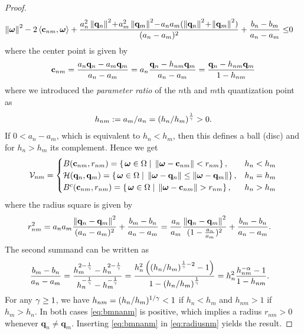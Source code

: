 \documentclass[12pt,onecolumn,final,letterpaper]{IEEEtran}
\renewcommand{\vp}{\mathbf q}
\newcommand{\HS}{\ensuremath{\mathcal{H}}}          %
\newcommand{\Vor}{\ensuremath{\mathcal{V}}}         %
\begin{document}
\begin{proof}
\begin{align*}
      \Norm{\vome}^2 -2 \skprod{\vc_{nm}}{\vome} + 
         \frac{a_n^2 \Norm{\vp_n}^2 \!+\!a_m^2 \Norm{\vp_m}^2 \!-\! a_na_m(\Norm{\vp_n}^2 \!+\!\Norm{\vp_m}^2)}{(a_n-a_m)^2} 
         + \frac{b_n-b_m}{a_n-a_m} \leq & 0
  \end{align*}
  where the center point is given by
  \begin{align}
    \vc_{nm}=\frac{a_n\vp_n- a_m\vp_m}{a_n-a_m}=a_n \frac{\vp_n-h_{nm} \vp_m}{a_n -a_m}=\frac{\vp_n -h_{nm}\vp_m}{1-h_{nm}} 
  \end{align}
  where we introduced the \emph{parameter ratio} of the $n$th and $m$th quantization point as
  \begin{align}
    h_{nm}:= a_m/a_n=\left(h_n /h_m\right)^{\frac{1}{\gamma}}>0.
  \end{align}
  If $0<a_n-a_m$, which is equivalent to $h_n<h_m$, then this defines a ball (disc) and for $h_n>h_m$ its complement. Hence we get
  \begin{align}
    \Vor_{nm}=\begin{cases}
      B(\vc_{nm},r_{nm})=\set{\vome\in\Omega}{\Norm{\vome-\vc_{nm}}    <  r_{nm}},&  h_n<h_m\\
      \HS(\vp_n,\vp_m) = \set{\vome\in\Omega}{ \Norm{\vome- \vp_n}\leq \Norm{\vome- \vp_m}}, &h_n=h_m\\
      B^c(\vc_{nm},r_{nm})=\set{\vome\in\Omega}{\Norm{\vome-\vc_{nm}}    >  r_{nm}},&  h_n >h_m
    \end{cases}
  \end{align}
  where the radius square is given by
  \begin{align}
    r_{nm}^2 
            &= a_na_m\frac{\Norm{\vp_n-\vp_m}^2}{(a_n-a_m)^2} + \frac{b_m-b_n}{a_n-a_m}=
            \frac{a_n}{a_m}\frac{\Norm{\vp_n-\vp_m}^2}{(1-\frac{a_n}{a_m})^2} +
            \frac{b_m-b_n}{a_n-a_m}\label{eq:radiusnm}.
  \end{align}
  The second summand can be written as
  \begin{align}
    \frac{b_m -b_n}{a_n -a_m} &
    = \frac{h_m^{2-\frac{1}{\gamma}} - h_n^{2-\frac{1}{\gamma}}}{h_n^{-\frac{1}{\gamma}}-h_m^{-\frac{1}{\gamma}}}
    = \frac{h_n^{2} \left(\left(h_n/h_m\right)^{\frac{1}{\gamma}-2} -1\right)}{1-\left(h_n/h_m\right)^{\frac{1}{\gamma}}} 
  = h_n^2 \frac{h_{nm}^{-\alpha} -1}{1-h_{nm}}
  \label{eq:bmnanm}.
  \end{align}
  For any $\gamma\geq 1$, we have $h_{nm}=(h_n/h_m)^{1/\gamma}< 1$ if $h_n<h_m$ and $h_{nm}>1$ if $h_m>h_n$.  In
  both cases \eqref{eq:bmnanm} is positive, which implies a radius
  $r_{nm}>0$ whenever $\vp_n\not=\vp_m$. Inserting \eqref{eq:bmnanm} in \eqref{eq:radiusnm} yields the result. 
\end{proof}
\end{document}
